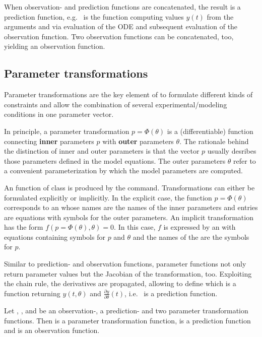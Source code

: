 \documentclass[article]{jss}
\begin{document}
When observation- and prediction functions are concatenated, the result is a prediction function, e.g.~ is the  function computing values $y(t)$ from the arguments  and  via evaluation of the ODE and subsequent evaluation of the observation function. Two observation functions can be concatenated, too, yielding an observation function.

\subsection{Parameter transformations}

Parameter transformations are the key element of  to formulate different kinds of constraints and allow the combination of several experimental/modeling conditions in one parameter vector.

In principle, a parameter transformation $p = \Phi(\theta)$ is a (differentiable) function connecting \textbf{inner} parameters $p$ with \textbf{outer} parameters $\theta$. The rationale behind the distinction of inner and outer parameters is that the vector $p$ usually desribes those parameters defined in the model equations. The outer parameters $\theta$ refer to a convenient parameterization by which the model parameters are computed.

An  function of class  is produced by the  command. Transformations can either be formulated explicitly or implicitly. In the explicit case, the function $p = \Phi(\theta)$ corresponds to an  whose names are the names of the inner parameters and entries are equations with symbols for the outer parameters. An implicit transformation has the form $f(p = \Phi(\theta), \theta) = 0$. In this case, $f$ is expressed by an  with equations containing symbols for $p$ and $\theta$ and the names of the  are the symbols for $p$.

Similar to prediction- and observation functions, parameter functions not only return parameter values but the Jacobian of the transformation, too. Exploiting the chain rule, the derivatives are propagated, allowing to define  which is a function returning $y(t, \theta)$ and $\frac{\partial y}{\partial \theta}(t)$, i.e.~ is a prediction function.

Let , ,  and  be an observation-, a prediction- and two parameter transformation functions. Then  is a parameter transformation function,  is a prediction function and  is an observation function.
\end{document}
